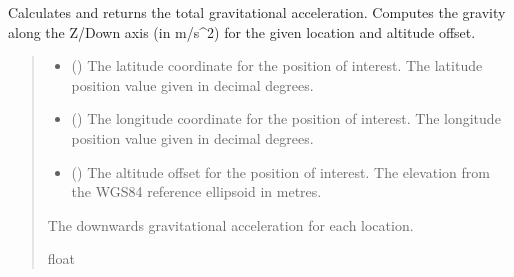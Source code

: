 \documentclass[letterpaper,10pt,english]{sphinxmanual}
\begin{document}
\begin{fulllineitems}
\begin{fulllineitems}
\label{\detokenize{modules/gravity/irish:qnav.gravity.irish.IrishSeaGravity.calc_gravity_z}}
\pysigstartsignatures
{}
\pysigstopsignatures
\sphinxAtStartPar
Calculates and returns the total gravitational acceleration.
Computes the gravity along the Z/Down axis (in m/s\textasciicircum{}2) for
the given location and altitude offset.
\begin{quote}\begin{description}
\begin{itemize}
\item {} 
\sphinxAtStartPar
{} () \textendash{} The latitude coordinate for the position of interest.
The latitude position value given in decimal degrees.

\item {} 
\sphinxAtStartPar
{} () \textendash{} The longitude coordinate for the position of interest.
The longitude position value given in decimal degrees.

\item {} 
\sphinxAtStartPar
{} () \textendash{} The altitude offset for the position of interest.
The elevation from the WGS\sphinxhyphen{}84 reference ellipsoid in metres.

\end{itemize}

\sphinxAtStartPar
The downwards gravitational acceleration for each location.

\sphinxAtStartPar
float

\end{description}\end{quote}

\end{fulllineitems}



\end{fulllineitems}
\end{document}
